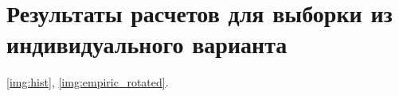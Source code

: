 \chapter{Результаты расчетов для выборки из индивидуального варианта}

\ref{img:hist}, \ref{img:empiric_rotated}.


